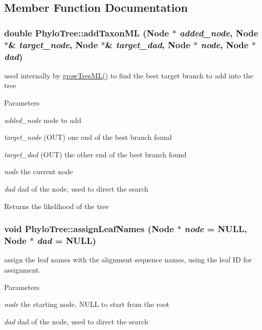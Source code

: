\subsection{Member Function Documentation}
\hypertarget{classPhyloTree_aa5fdafe246a24235967981a2df3faffb}{
\subsubsection[{addTaxonML}]{\setlength{\rightskip}{0pt plus 5cm}double PhyloTree::addTaxonML ({\bf Node} $\ast$ {\em added\_\-node}, \/  {\bf Node} $\ast$\& {\em target\_\-node}, \/  {\bf Node} $\ast$\& {\em target\_\-dad}, \/  {\bf Node} $\ast$ {\em node}, \/  {\bf Node} $\ast$ {\em dad})}}
\label{classPhyloTree_aa5fdafe246a24235967981a2df3faffb}
used internally by \hyperlink{classPhyloTree_a2de074f797940b19f9b1e923fe6c814a}{growTreeML()} to find the best target branch to add into the tree 
\begin{DoxyParams}{Parameters}
\item[{\em added\_\-node}]node to add \item[{\em target\_\-node}](OUT) one end of the best branch found \item[{\em target\_\-dad}](OUT) the other end of the best branch found \item[{\em node}]the current node \item[{\em dad}]dad of the node, used to direct the search \end{DoxyParams}
\begin{DoxyReturn}{Returns}
the likelihood of the tree 
\end{DoxyReturn}
\hypertarget{classPhyloTree_a5a35504080c18e60b3a3019c8d457253}{
\subsubsection[{assignLeafNames}]{\setlength{\rightskip}{0pt plus 5cm}void PhyloTree::assignLeafNames ({\bf Node} $\ast$ {\em node} = {\ttfamily NULL}, \/  {\bf Node} $\ast$ {\em dad} = {\ttfamily NULL})}}
\label{classPhyloTree_a5a35504080c18e60b3a3019c8d457253}
assign the leaf names with the alignment sequence names, using the leaf ID for assignment. 
\begin{DoxyParams}{Parameters}
\item[{\em node}]the starting node, NULL to start from the root \item[{\em dad}]dad of the node, used to direct the search \end{DoxyParams}
